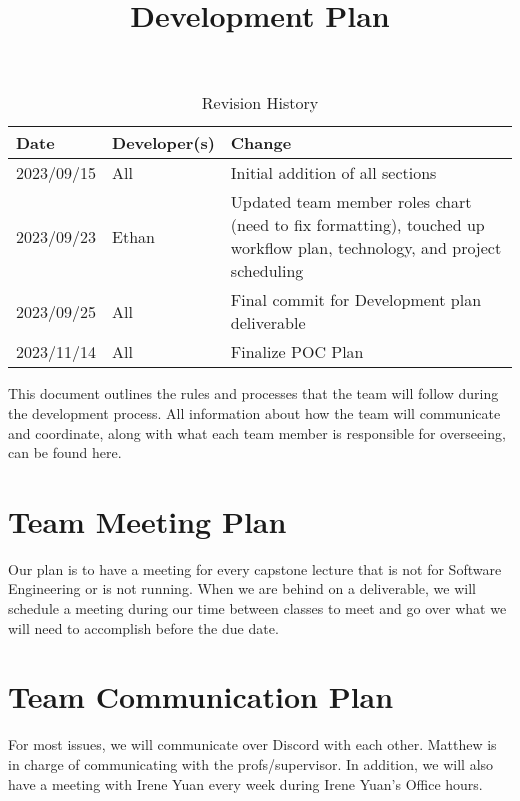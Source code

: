 \documentclass{article}
\title{Development Plan\\\progname}
\author{\authname}
\date{}
\begin{document}
\maketitle

\begin{table}[hp]
\caption{Revision History} \label{TblRevisionHistory}
\begin{tabularx}{\textwidth}{llX}
\toprule
\textbf{Date} & \textbf{Developer(s)} & \textbf{Change}\\
\midrule
2023/09/15 & All & Initial addition of all sections\\
2023/09/23 & Ethan & Updated team member roles chart (need to fix formatting), touched up workflow plan, technology, and project scheduling  \\
2023/09/25 & All & Final commit for Development plan deliverable\\
2023/11/14 & All & Finalize POC Plan\\

\bottomrule
\end{tabularx}
\end{table}

This document outlines the rules and processes that the team will follow during the development process. All information about how the team will communicate and coordinate, along with what each team member is responsible for overseeing, can be found here.

\section{Team Meeting Plan}

Our plan is to have a meeting for every capstone lecture that is not for Software Engineering or is not running. When we are behind on a deliverable, we will schedule a meeting during our time between classes to meet and go over what we will need to accomplish before the due date.

\section{Team Communication Plan}
For most issues, we will communicate over Discord with each other. Matthew is in charge of communicating with the profs/supervisor. In addition, we will also have a meeting with Irene Yuan every week during Irene Yuan's Office hours. 
\newpage
\end{document}
